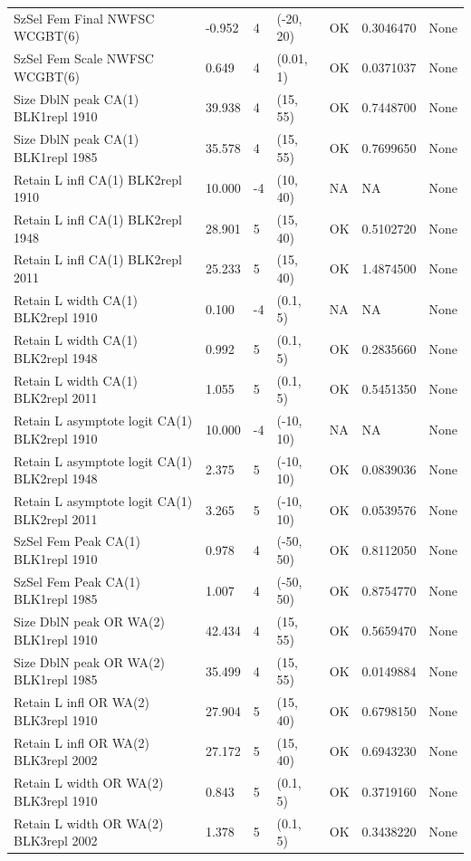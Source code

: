 \documentclass[11pt,
  english,
  a4paper,
]{article}
\begin{document}
\begin{landscape}
\begin{longtable}[t]{>{\raggedright\arraybackslash}p{7cm}lllll>{\raggedright\arraybackslash}p{4cm}}
SzSel Fem Final NWFSC WCGBT(6) & -0.952 & 4 & (-20, 20) & OK & 0.3046470 & None\\
SzSel Fem Scale NWFSC WCGBT(6) & 0.649 & 4 & (0.01, 1) & OK & 0.0371037 & None\\
Size DblN peak CA(1) BLK1repl 1910 & 39.938 & 4 & (15, 55) & OK & 0.7448700 & None\\
Size DblN peak CA(1) BLK1repl 1985 & 35.578 & 4 & (15, 55) & OK & 0.7699650 & None\\
Retain L infl CA(1) BLK2repl 1910 & 10.000 & -4 & (10, 40) & NA & NA & None\\
Retain L infl CA(1) BLK2repl 1948 & 28.901 & 5 & (15, 40) & OK & 0.5102720 & None\\
Retain L infl CA(1) BLK2repl 2011 & 25.233 & 5 & (15, 40) & OK & 1.4874500 & None\\
Retain L width CA(1) BLK2repl 1910 & 0.100 & -4 & (0.1, 5) & NA & NA & None\\
Retain L width CA(1) BLK2repl 1948 & 0.992 & 5 & (0.1, 5) & OK & 0.2835660 & None\\
Retain L width CA(1) BLK2repl 2011 & 1.055 & 5 & (0.1, 5) & OK & 0.5451350 & None\\
Retain L asymptote logit CA(1) BLK2repl 1910 & 10.000 & -4 & (-10, 10) & NA & NA & None\\
Retain L asymptote logit CA(1) BLK2repl 1948 & 2.375 & 5 & (-10, 10) & OK & 0.0839036 & None\\
Retain L asymptote logit CA(1) BLK2repl 2011 & 3.265 & 5 & (-10, 10) & OK & 0.0539576 & None\\
SzSel Fem Peak CA(1) BLK1repl 1910 & 0.978 & 4 & (-50, 50) & OK & 0.8112050 & None\\
SzSel Fem Peak CA(1) BLK1repl 1985 & 1.007 & 4 & (-50, 50) & OK & 0.8754770 & None\\
Size DblN peak OR WA(2) BLK1repl 1910 & 42.434 & 4 & (15, 55) & OK & 0.5659470 & None\\
Size DblN peak OR WA(2) BLK1repl 1985 & 35.499 & 4 & (15, 55) & OK & 0.0149884 & None\\
Retain L infl OR WA(2) BLK3repl 1910 & 27.904 & 5 & (15, 40) & OK & 0.6798150 & None\\
Retain L infl OR WA(2) BLK3repl 2002 & 27.172 & 5 & (15, 40) & OK & 0.6943230 & None\\
Retain L width OR WA(2) BLK3repl 1910 & 0.843 & 5 & (0.1, 5) & OK & 0.3719160 & None\\
Retain L width OR WA(2) BLK3repl 2002 & 1.378 & 5 & (0.1, 5) & OK & 0.3438220 & None\\

\end{longtable}
\end{landscape}
\end{document}
